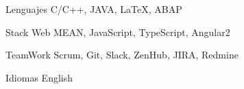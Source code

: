 


\begin{cvskills}


\cvskill
{Lenguajes} %
{C/C++, JAVA, \LaTeX{}, ABAP} %


\cvskill
{Stack Web} %
{MEAN, JavaScript, TypeScript, Angular2} %

\cvskill
{TeamWork} %
{Scrum, Git, Slack, ZenHub, JIRA, Redmine} %

\cvskill
{Idiomas} %
{English} %


\end{cvskills}

